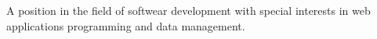 \documentclass[9pt]{developercv} %
\begin{document}
\vspace{0.5cm}


\begin{minipage}[t]{0.4\textwidth} %

 A position in the field of softwear development with special interests in web applications programming and data management.
 
\end{minipage}
\hfill %
\begin{minipage}[t]{0.5\textwidth} %
	\vspace{-\baselineskip} %
	\begin{barchart}{5.5}
	\end{barchart}
\end{minipage}

\begin{center}
\end{center}


\end{document}
